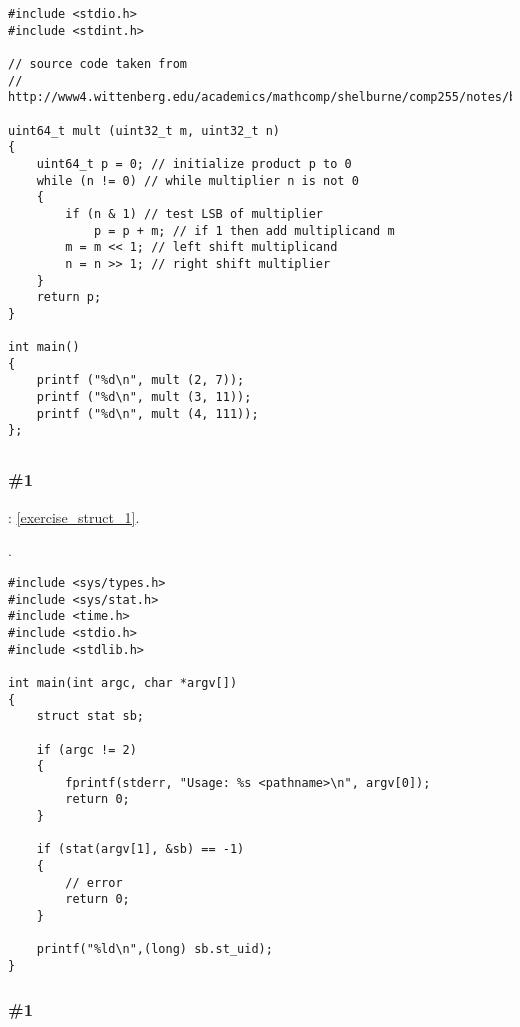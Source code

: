 \begin{lstlisting}
#include <stdio.h>
#include <stdint.h>

// source code taken from
// http://www4.wittenberg.edu/academics/mathcomp/shelburne/comp255/notes/binarymultiplication.pdf

uint64_t mult (uint32_t m, uint32_t n)
{
    uint64_t p = 0; // initialize product p to 0 
    while (n != 0) // while multiplier n is not 0 
    { 
        if (n & 1) // test LSB of multiplier 
            p = p + m; // if 1 then add multiplicand m 
        m = m << 1; // left shift multiplicand 
        n = n >> 1; // right shift multiplier 
    }
    return p;
}

int main()
{
    printf ("%d\n", mult (2, 7));
    printf ("%d\n", mult (3, 11));
    printf ("%d\n", mult (4, 111));
};
\end{lstlisting}

\subsection{}

\subsubsection{\Exercise \#1}
\label{exercise_solutions_struct_1}

\Exercise: \ref{exercise_struct_1}.

.

\begin{lstlisting}
#include <sys/types.h>
#include <sys/stat.h>
#include <time.h>
#include <stdio.h>
#include <stdlib.h>

int main(int argc, char *argv[])
{
    struct stat sb;

    if (argc != 2) 
    {
        fprintf(stderr, "Usage: %s <pathname>\n", argv[0]);
        return 0;
    }

    if (stat(argv[1], &sb) == -1) 
    {
    	// error
        return 0;
    }

    printf("%ld\n",(long) sb.st_uid);
}
\end{lstlisting}

\subsubsection{\Exercise \#1}
\label{exercise_solutions_struct_2}

